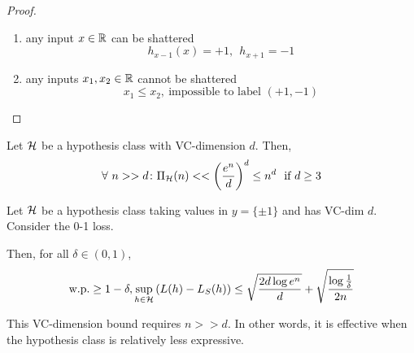\begin{proof}
    \begin{enumerate}
        \item any input \(x \in \mathbb{R}\) can be shattered 
        \[
            h_{x-1}(x) = +1, \ \ h_{x+1} = -1 
        \]
        \item any inputs \(x_1, x_2 \in \mathbb{R}\) cannot be shattered 
        \[
            x_1 \leq x_2, \ \text{impossible to label } (+1, -1)  
        \]
    \end{enumerate}
\end{proof}



\begin{theorem}
    Let \(\mathcal{H}\) be a hypothesis class with VC-dimension \(d\). Then, 
    \[
        \forall \ n >> d \colon \Pi_\Hcal (n) << \left(\frac{e^n}{d}\right)^d \leq n^d \ \ \text{if } d \geq 3  
    \]
\end{theorem}


\begin{theorem}
    Let \(\mathcal{H}\) be a hypothesis class taking values in \(y = \{\pm 1\}\) and has 
    VC-dim \(d\). Consider the 0-1 loss. 

    Then, for all \(\delta \in (0, 1)\), 
    \[
    \text{w.p.} \geq 1 - \delta, \sup_{h \in \mathcal{H}} \left(L(h) - L_S(h)\right) \leq 
    \sqrt{\frac{2d \log e^n}{d}} + \sqrt{\frac{\log \frac{1}{\delta}}{2n}}  
    \]
\end{theorem}

\begin{remark}
    This VC-dimension bound requires \(n >> d\). In other words, it is effective when the 
    hypothesis class is relatively less expressive. 
\end{remark}